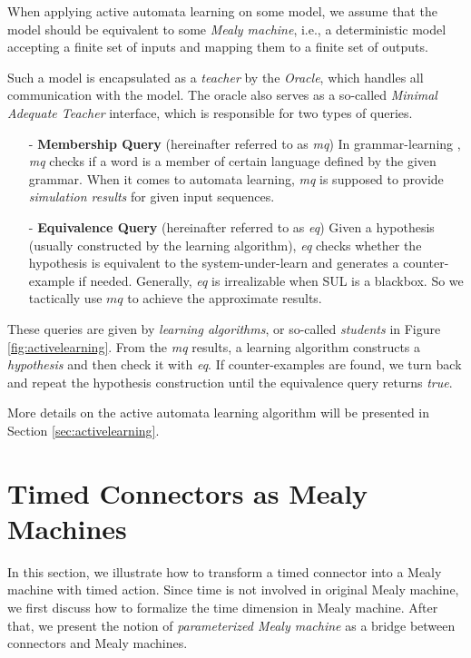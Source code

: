 \documentclass[conference, a4paper]{IEEEtran}
\begin{document}
When applying active automata learning on some model, we assume that the model should be equivalent
to some \emph{Mealy machine}, i.e., a deterministic model accepting a finite set of inputs and
mapping them to a finite set of outputs.

Such a model is encapsulated as a \emph{teacher} by the \emph{Oracle}, which handles
all communication with the model. The oracle also serves as a so-called \emph{Minimal Adequate Teacher}
interface, which is responsible for two types of queries. 

\begin{itemize}
  \item[-] \textbf{Membership Query} (hereinafter referred to as \emph{mq}) In grammar-learning
    \cite{DBLP:journals/iandc/Angluin87}, \emph{mq} checks if a word is a member of certain language
    defined by the given grammar. When it comes to
    automata learning, \emph{mq} is supposed to provide \emph{simulation results} for given input
    sequences.
  \item[-] \textbf{Equivalence Query} (hereinafter referred to as \emph{eq}) Given a hypothesis
    (usually constructed by the learning algorithm), \emph{eq} checks whether the hypothesis is
    equivalent to the system-under-learn and generates a counter-example if needed. Generally, 
    \emph{eq} is irrealizable when SUL is a blackbox. So we tactically use $mq$ to achieve the
    approximate results.
\end{itemize}

These queries are given by \emph{learning algorithms}, or so-called \emph{students} in Figure
\ref{fig:activelearning}. From the \emph{mq} results, a learning algorithm constructs a
\emph{hypothesis} and then check it with \emph{eq}. If counter-examples are found, we turn back and
repeat the hypothesis construction until the equivalence query returns \emph{true}.

More details on the active automata learning algorithm will be presented in Section
\ref{sec:activelearning}. 


\section{Timed Connectors as Mealy Machines}
\label{sec:semantics}

In this section, we illustrate how to transform a timed connector into a Mealy machine with timed
action.
Since time is not involved in original Mealy machine, we first discuss how to formalize the time
dimension in Mealy machine. After that, we present the notion of \emph{parameterized Mealy
machine} as a bridge between connectors and Mealy machines.
\end{document}
